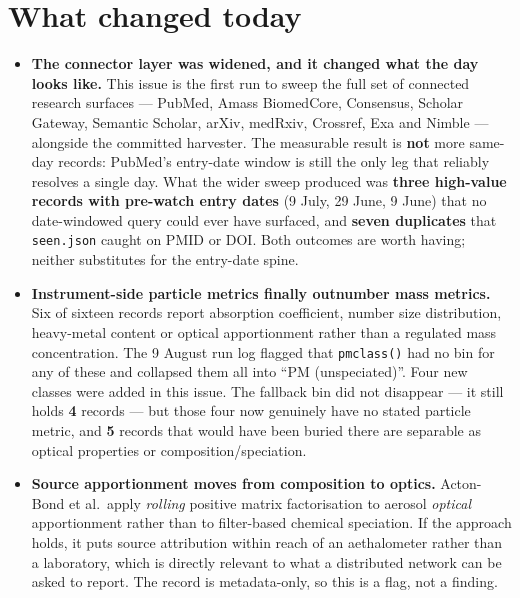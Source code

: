 \documentclass[10pt]{article}
\begin{document}
\vspace{3mm}

\clearpage

\section*{\sffamily\bfseries\color{Deep}What changed today}
\vspace{-1.5mm}{\color{Amber}\rule{\linewidth}{1.1pt}}\vspace{2.5mm}

\footnotesize
\begin{itemize}
\item \textbf{The connector layer was widened, and it changed what the day looks like.}
This issue is the first run to sweep the full set of connected research surfaces ---
PubMed, Amass BiomedCore, Consensus, Scholar Gateway, Semantic Scholar, arXiv, medRxiv,
Crossref, Exa and Nimble --- alongside the committed harvester. The measurable result is
\textbf{not} more same-day records: PubMed's entry-date window is still the only leg that
reliably resolves a single day. What the wider sweep produced was \textbf{three
high-value records with pre-watch entry dates} (9 July, 29 June, 9 June) that no
date-windowed query could ever have surfaced, and \textbf{seven duplicates} that
\texttt{seen.json} caught on PMID or DOI. Both outcomes are worth having; neither
substitutes for the entry-date spine.

\item \textbf{Instrument-side particle metrics finally outnumber mass metrics.}
Six of sixteen records report absorption coefficient, number size distribution,
heavy-metal content or optical apportionment rather than a regulated mass concentration.
The 9 August run log flagged that \texttt{pmclass()} had no bin for any of these and
collapsed them all into ``PM (unspeciated)''. Four new classes were added in this issue.
The fallback bin did not disappear --- it still holds \textbf{4} records --- but those
four now genuinely have no stated particle metric, and \textbf{5} records that would have
been buried there are separable as optical properties or composition/speciation.

\item \textbf{Source apportionment moves from composition to optics.}
Acton-Bond et al.\ apply \emph{rolling} positive matrix factorisation to aerosol
\emph{optical} apportionment rather than to filter-based chemical speciation. If the
approach holds, it puts source attribution within reach of an aethalometer rather than a
laboratory, which is directly relevant to what a distributed network can be asked to
report. The record is metadata-only, so this is a flag, not a finding.


\end{itemize}
\end{document}
